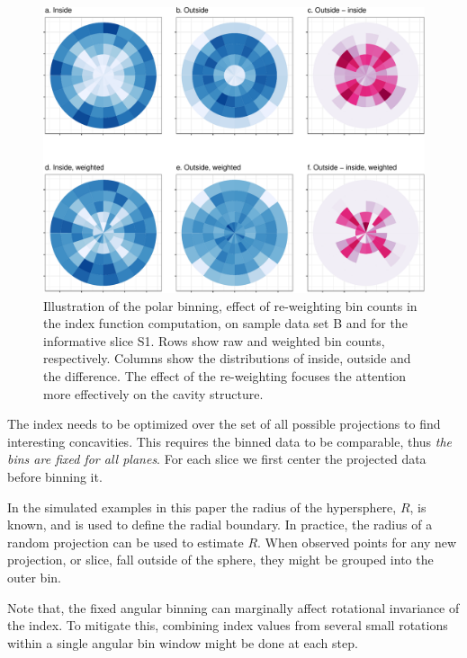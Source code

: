 \documentclass[]{interact}
\theoremstyle{plain}%
\theoremstyle{definition}
\theoremstyle{remark}
\begin{document}
\begin{figure}

{\centering \includegraphics[width=0.9\linewidth]{section_pursuit_files/figure-latex/data_and_densities-1} 

}

\caption{Illustration of the polar binning, effect of re-weighting bin counts in the index function computation, on sample data set B and for the informative slice S1. Rows show raw and weighted bin counts, respectively. Columns show the distributions of inside, outside and the difference. The effect of the re-weighting focuses the attention more effectively on the cavity structure.}\label{fig:data_and_densities}
\end{figure}

The index needs to be optimized over the set of all possible projections
to find interesting concavities. This requires the binned data to be
comparable, thus \emph{the bins are fixed for all planes}. For each
slice we first center the projected data before binning it.

In the simulated examples in this paper the radius of the hypersphere,
\(R\), is known, and is used to define the radial boundary. In practice,
the radius of a random projection can be used to estimate \(R\). When
observed points for any new projection, or slice, fall outside of the
sphere, they might be grouped into the outer bin.

Note that, the fixed angular binning can marginally affect rotational
invariance of the index. To mitigate this, combining index values from
several small rotations within a single angular bin window might be done
at each step.
\end{document}
